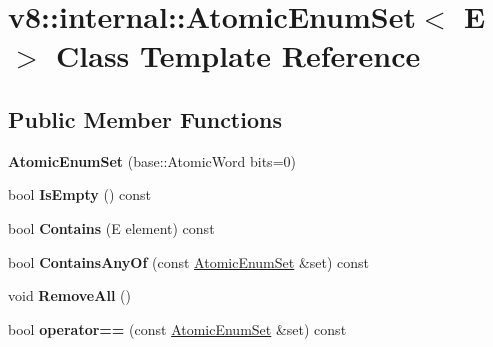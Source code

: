 \hypertarget{classv8_1_1internal_1_1_atomic_enum_set}{}\section{v8\+:\+:internal\+:\+:Atomic\+Enum\+Set$<$ E $>$ Class Template Reference}
\label{classv8_1_1internal_1_1_atomic_enum_set}
\subsection*{Public Member Functions}
\begin{DoxyCompactItemize}
\item 
{\bfseries Atomic\+Enum\+Set} (base\+::\+Atomic\+Word bits=0)\hypertarget{classv8_1_1internal_1_1_atomic_enum_set_aeb496d9622327aeeebd88635405ea712}{}\label{classv8_1_1internal_1_1_atomic_enum_set_aeb496d9622327aeeebd88635405ea712}

\item 
bool {\bfseries Is\+Empty} () const \hypertarget{classv8_1_1internal_1_1_atomic_enum_set_a2ff65c435f2684b63514838def8f188f}{}\label{classv8_1_1internal_1_1_atomic_enum_set_a2ff65c435f2684b63514838def8f188f}

\item 
bool {\bfseries Contains} (E element) const \hypertarget{classv8_1_1internal_1_1_atomic_enum_set_a60e58dcf32b1bc17935f92357825488b}{}\label{classv8_1_1internal_1_1_atomic_enum_set_a60e58dcf32b1bc17935f92357825488b}

\item 
bool {\bfseries Contains\+Any\+Of} (const \hyperlink{classv8_1_1internal_1_1_atomic_enum_set}{Atomic\+Enum\+Set} \&set) const \hypertarget{classv8_1_1internal_1_1_atomic_enum_set_aee3de09414f9863cfa4c7c2cf7056b11}{}\label{classv8_1_1internal_1_1_atomic_enum_set_aee3de09414f9863cfa4c7c2cf7056b11}

\item 
void {\bfseries Remove\+All} ()\hypertarget{classv8_1_1internal_1_1_atomic_enum_set_a7db4dd0c690a2af91d0c1b1ebfdb5fc1}{}\label{classv8_1_1internal_1_1_atomic_enum_set_a7db4dd0c690a2af91d0c1b1ebfdb5fc1}

\item 
bool {\bfseries operator==} (const \hyperlink{classv8_1_1internal_1_1_atomic_enum_set}{Atomic\+Enum\+Set} \&set) const \hypertarget{classv8_1_1internal_1_1_atomic_enum_set_a034e6093cd015079c1ebb77d3a501736}{}\label{classv8_1_1internal_1_1_atomic_enum_set_a034e6093cd015079c1ebb77d3a501736}


\end{DoxyCompactItemize}
